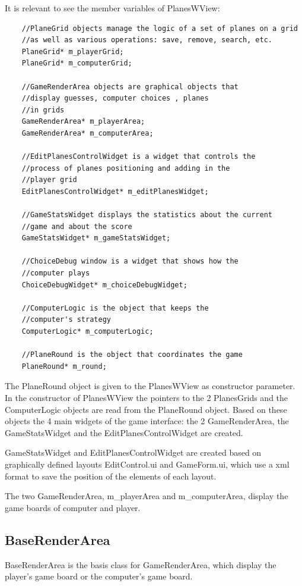 It is relevant to see the member variables of PlanesWView:

\begin{lstlisting}
	//PlaneGrid objects manage the logic of a set of planes on a grid
	//as well as various operations: save, remove, search, etc.
	PlaneGrid* m_playerGrid;
	PlaneGrid* m_computerGrid;
	
	//GameRenderArea objects are graphical objects that
	//display guesses, computer choices , planes
	//in grids
	GameRenderArea* m_playerArea;
	GameRenderArea* m_computerArea;
	
	//EditPlanesControlWidget is a widget that controls the
	//process of planes positioning and adding in the
	//player grid
	EditPlanesControlWidget* m_editPlanesWidget;
	
	//GameStatsWidget displays the statistics about the current
	//game and about the score
	GameStatsWidget* m_gameStatsWidget;
	
	//ChoiceDebug window is a widget that shows how the
	//computer plays
	ChoiceDebugWidget* m_choiceDebugWidget;
	
	//ComputerLogic is the object that keeps the
	//computer's strategy
	ComputerLogic* m_computerLogic;
	
	//PlaneRound is the object that coordinates the game
	PlaneRound* m_round;
\end{lstlisting}

The PlaneRound object is given to the PlanesWView as constructor parameter. In the constructor of PlanesWView the pointers to the 2 PlanesGrids and the ComputerLogic objects are read from the PlaneRound object. Based on these objects the 4 main widgets of the game interface: the 2 GameRenderArea, the GameStatsWidget and the EditPlanesControlWidget are created.

GameStatsWidget and EditPlanesControlWidget are created based on graphically defined layouts EditControl.ui and GameForm.ui, which use a xml format to save the position of the elements of each layout.

The two GameRenderArea, m\_playerArea and m\_computerArea, display the game boards of computer and player.


\subsection{BaseRenderArea}

BaseRenderArea is the basis class for GameRenderArea, which display the player's game board or the computer's game board. 

